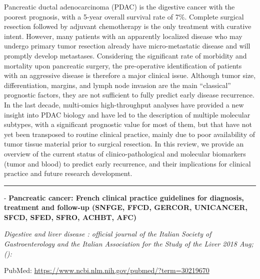 \documentclass[]{article}
\begin{document}
Pancreatic ductal adenocarcinoma (PDAC) is the digestive cancer with the
poorest prognosis, with a 5-year overall survival rate of 7\%. Complete
surgical resection followed by adjuvant chemotherapy is the only
treatment with curative intent. However, many patients with an
apparently localized disease who may undergo primary tumor resection
already have micro-metastatic disease and will promptly develop
metastases. Considering the significant rate of morbidity and mortality
upon pancreatic surgery, the pre-operative identification of patients
with an aggressive disease is therefore a major clinical issue. Although
tumor size, differentiation, margins, and lymph node invasion are the
main ``classical'' prognostic factors, they are not sufficient to fully
predict early disease recurrence. In the last decade, multi-omics
high-throughput analyses have provided a new insight into PDAC biology
and have led to the description of multiple molecular subtypes, with a
significant prognostic value for most of them, but that have not yet
been transposed to routine clinical practice, mainly due to poor
availability of tumor tissue material prior to surgical resection. In
this review, we provide an overview of the current status of
clinico-pathological and molecular biomarkers (tumor and blood) to
predict early recurrence, and their implications for clinical practice
and future research development.

{}

{}

\begin{center}\rule{0.5\linewidth}{\linethickness}\end{center}

 - \textbf{Pancreatic cancer: French clinical practice guidelines for
diagnosis, treatment and follow-up (SNFGE, FFCD, GERCOR, UNICANCER,
SFCD, SFED, SFRO, ACHBT, AFC)}

\emph{Digestive and liver disease : official journal of the Italian
Society of Gastroenterology and the Italian Association for the Study of
the Liver 2018 Aug;():}

PubMed: \url{https://www.ncbi.nlm.nih.gov/pubmed/?term=30219670}
\end{document}
